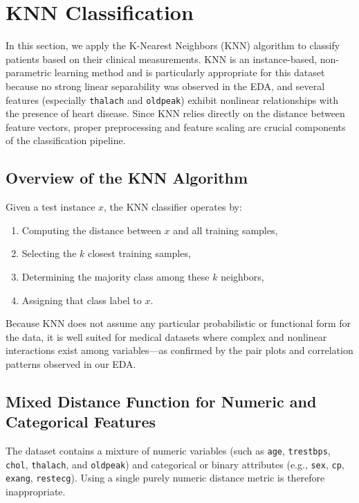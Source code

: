 \section{KNN Classification}

In this section, we apply the K-Nearest Neighbors (KNN) algorithm to classify patients based on their
clinical measurements. KNN is an instance-based, non-parametric learning method and is particularly
appropriate for this dataset because no strong linear separability was observed in the EDA, and several
features (especially \texttt{thalach} and \texttt{oldpeak}) exhibit nonlinear relationships with the
presence of heart disease. Since KNN relies directly on the distance between feature vectors, proper
preprocessing and feature scaling are crucial components of the classification pipeline.

\subsection{Overview of the KNN Algorithm}

Given a test instance $x$, the KNN classifier operates by:

\begin{enumerate}
	\item Computing the distance between $x$ and all training samples,
	\item Selecting the $k$ closest training samples,
	\item Determining the majority class among these $k$ neighbors,
	\item Assigning that class label to $x$.
\end{enumerate}

Because KNN does not assume any particular probabilistic or functional form for the data, it is well suited
for medical datasets where complex and nonlinear interactions exist among variables---as confirmed by the
pair plots and correlation patterns observed in our EDA.

\subsection{Mixed Distance Function for Numeric and Categorical Features}

The dataset contains a mixture of numeric variables (such as \texttt{age}, \texttt{trestbps},
\texttt{chol}, \texttt{thalach}, and \texttt{oldpeak}) and categorical or binary attributes
(e.g., \texttt{sex}, \texttt{cp}, \texttt{exang}, \texttt{restecg}). Using a single purely
numeric distance metric is therefore inappropriate.

